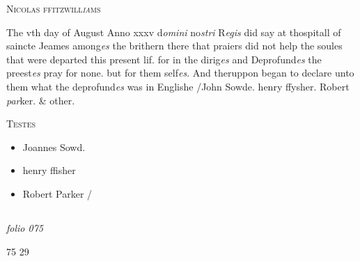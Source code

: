 \documentclass[12pt, a4paper]{book}
\begin{document}
               
               	
				\begin{center}  {\scshape Nicolas ffitzwill\textit{ia}ms}  \end{center}
			
               	
               		
			
               		
		\ifthenelse{\isodd{\thepage}}
		{\reversemarginpar}
		{\normalmarginpar}
		The vth day of August Anno xxxv d\textit{omini} no\textit{stri }R\textit{egis} did say
 at thospitall of saincte Jeames among\textit{es} the brithern
  there that praiers did not help the soules that
 were departed this present lif. for in the dirig\textit{es}
 and Deprofund\textit{es} the preest\textit{es} pray for none.
 but for them self\textit{es}. And theruppon began
 to declare unto them what the deprofund\textit{es} was
               		in Englishe /John Sowde. henry ffysher.
               		Robert \textit{par}ker. \& other.
               	
 
 	\begin{center} {\scshape Testes} \end{center}\begin{itemize}
	 	
	 	\item[]Joannes Sowd.
	 	\item[]henry ffisher
	 	\item[]Robert Parker /
 	\end{itemize}
 
 


            
            
\dotfill
					  \subsection*{}  \subsection*{}

\textit{folio 075}


\begin{flushright}{\color{Mahogany}75} 29\end{flushright}
 
\end{document}
